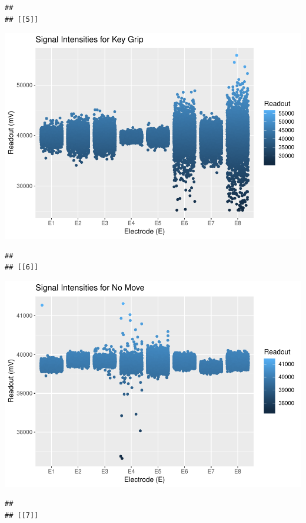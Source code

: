 \documentclass[]{article}
\begin{document}
\begin{verbatim}
## 
## [[5]]
\end{verbatim}

\includegraphics{Megahand_files/figure-latex/unnamed-chunk-6-5.pdf}

\begin{verbatim}
## 
## [[6]]
\end{verbatim}

\includegraphics{Megahand_files/figure-latex/unnamed-chunk-6-6.pdf}

\begin{verbatim}
## 
## [[7]]
\end{verbatim}
\end{document}
